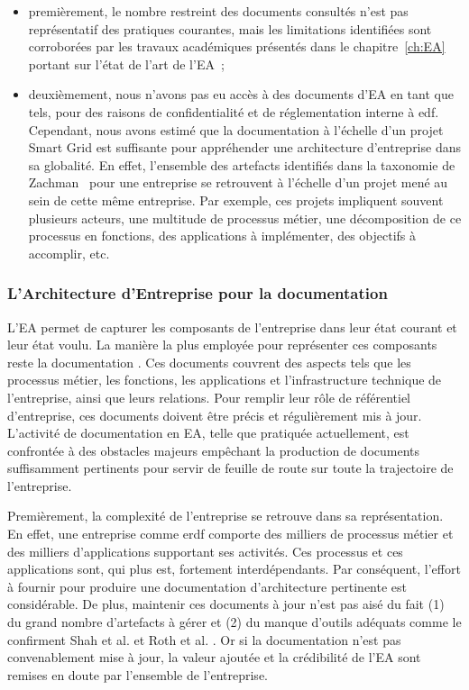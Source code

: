 \begin{itemize}
    \item premièrement, le nombre restreint des documents consultés n'est pas
    représentatif des pratiques courantes, mais les limitations identifiées
    sont corroborées par les travaux académiques présentés dans le
    chapitre~\ref{ch:EA} portant sur l'état de l'art de l'EA~;

    \item deuxièmement, nous n'avons pas eu accès à des documents d'EA en tant
    que tels, pour des raisons de confidentialité et de réglementation interne
    à \gls{edf}. Cependant, nous avons estimé que la documentation à l'échelle
    d'un projet Smart Grid est suffisante pour appréhender une architecture
    d'entreprise dans sa globalité. En effet, l'ensemble des artefacts
    identifiés dans la taxonomie de Zachman~\cite{zachman1987framework} pour
    une entreprise se retrouvent à l'échelle d'un projet mené au sein de cette
    même entreprise.  Par exemple, ces projets impliquent souvent plusieurs
    acteurs, une multitude de processus métier, une décomposition de ce
    processus en fonctions, des applications à implémenter, des objectifs à
    accomplir, etc.
\end{itemize}

\subsubsection{L'Architecture d'Entreprise pour la documentation}

L'EA permet de capturer les composants de l'entreprise dans leur état courant
et leur état voulu. La manière la plus employée pour représenter ces composants
reste la documentation \cite{barn2013enterprise}. Ces documents couvrent des
aspects tels que les processus métier, les fonctions, les applications et
l'infrastructure technique de l'entreprise, ainsi que leurs relations. Pour
remplir leur rôle de référentiel d'entreprise, ces documents doivent être
précis et régulièrement mis à jour. L'activité de documentation en EA, telle
que pratiquée actuellement, est confrontée à des obstacles majeurs empêchant la
production de documents suffisamment pertinents pour servir de feuille de route
sur toute la trajectoire de l'entreprise.

Premièrement, la complexité de l'entreprise se retrouve dans sa représentation.
En effet, une entreprise comme \gls{erdf} comporte des milliers de processus
métier et des milliers d'applications supportant ses activités.  Ces processus
et ces applications sont, qui plus est, fortement interdépendants. Par
conséquent, l'effort à fournir pour produire une documentation d'architecture
pertinente est considérable. De plus, maintenir ces documents à jour n'est pas
aisé du fait (1) du grand nombre d'artefacts à gérer et (2) du manque d'outils
adéquats comme le confirment Shah et al. \cite{shah2007frameworks} et Roth et
al. \cite{roth2013enterprise}. Or si la documentation n'est pas convenablement
mise à jour, la valeur ajoutée et la crédibilité de l'EA sont remises en doute
par l'ensemble de l'entreprise.

